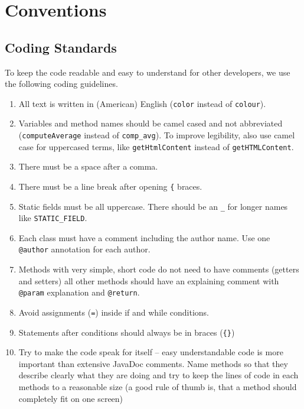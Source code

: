 \chapter{Conventions}

\section{Coding Standards}
To keep the code readable and easy to understand for other developers, we use the following coding guidelines.

\begin{enumerate}

	\item All text is written in (American) English (\texttt{color} instead of \texttt{colour}).

	\item Variables and method names should be camel cased and not abbreviated (\texttt{computeAverage} instead of \texttt{comp\_avg}). To improve legibility, also use camel case for uppercased terms, like \texttt{getHtmlContent} instead of \texttt{getHTMLContent}.

	\item There must be a space after a comma.

	\item There must be a line break after opening \texttt{\{} braces.

	\item Static fields must be all uppercase. There should be an \texttt{\_} for longer names like \texttt{STATIC\_FIELD}.

	\item Each class must have a comment including the author name. Use one \texttt{@author} annotation for each author.

	\item Methods with very simple, short code do not need to have comments (getters and setters) all other methods should have an explaining comment with \texttt{@param} explanation and \texttt{@return}.

	\item Avoid assignments (\texttt{=}) inside if and while conditions.

	\item Statements after conditions should always be in braces (\texttt{\{\}})
	
	\item Try to make the code speak for itself -- easy understandable code is more important than extensive JavaDoc comments. Name methods so that they describe clearly what they are doing and try to keep the lines of code in each methods to a reasonable size (a good rule of thumb is, that a method should completely fit on one screen)
	
\end{enumerate}

